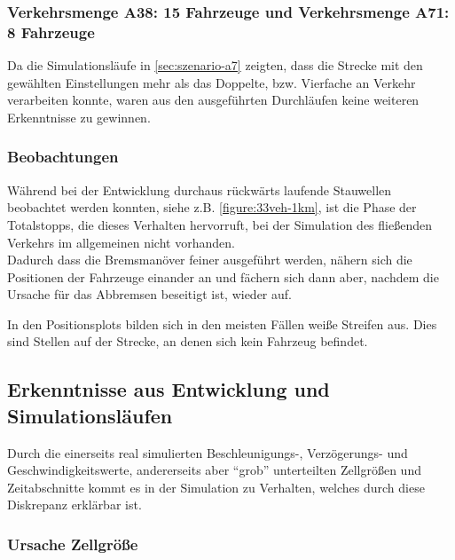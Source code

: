 \subsubsection{Verkehrsmenge A38: 15 Fahrzeuge und Verkehrsmenge A71: 8 Fahrzeuge}
\label{sec:szenario-a38-a71}

Da die Simulationsläufe in \cref{sec:szenario-a7} zeigten, dass die Strecke mit den gewählten Einstellungen mehr als das Doppelte, bzw. Vierfache an Verkehr verarbeiten konnte, waren aus den ausgeführten Durchläufen keine weiteren Erkenntnisse zu gewinnen.



\subsubsection{Beobachtungen}

Während bei der Entwicklung durchaus rückwärts laufende Stauwellen beobachtet werden konnten, siehe z.B. \cref{figure:33veh-1km}, ist die Phase der Totalstopps, die dieses Verhalten hervorruft, bei der Simulation des fließenden Verkehrs im allgemeinen nicht vorhanden.
\\
Dadurch dass die Bremsmanöver feiner ausgeführt werden, nähern sich die Positionen der Fahrzeuge einander an und fächern sich dann aber, nachdem die Ursache für das Abbremsen beseitigt ist, wieder auf.

In den Positionsplots bilden sich in den meisten Fällen weiße Streifen aus. Dies sind Stellen auf der Strecke, an denen sich kein Fahrzeug befindet.






\subsection{Erkenntnisse aus Entwicklung und Simulationsläufen}

Durch die einerseits real simulierten Beschleunigungs-, Verzögerungs- und Geschwindigkeitswerte, andererseits aber \enquote{grob} unterteilten Zellgrößen und Zeitabschnitte kommt es in der Simulation zu Verhalten, welches durch diese Diskrepanz erklärbar ist.



\subsubsection{Ursache Zellgröße}

